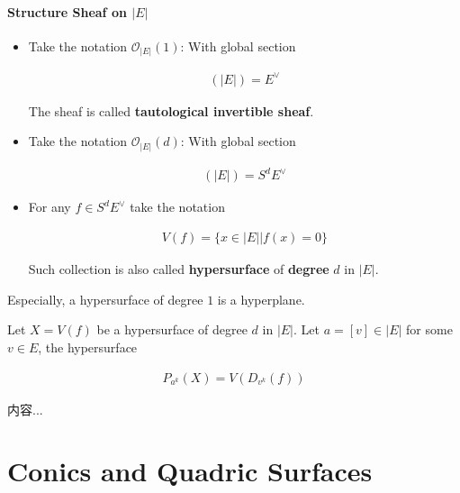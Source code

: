 \documentclass[Total.tex]{subfiles}
\begin{document}
		\subsubsection{Structure Sheaf on $|E|$}
		
		\begin{Def}
			\begin{itemize}
				\item Take the notation $\mathcal{O}_{|E|}(1)$: With global section
				
				\begin{gather*}
					[\mathcal{O}_{|E|}(1)](|E|)=E^\vee
				\end{gather*}
				
				The sheaf is called \textbf{tautological invertible sheaf}.
				
				\item Take the notation $\mathcal{O}_{|E|}(d)$: With global section
				
				\begin{gather*}
					[\mathcal{O}_{|E|}(d)](|E|)=S^dE^\vee
				\end{gather*}
				
				\item  For any $f\in S^d E^\vee$ take the notation 
				
				\begin{gather*}
					V(f)=\{x\in |E||f(x)=0\}
				\end{gather*}
				
				Such collection is also called \textbf{hypersurface} of \textbf{degree} $d$ in $|E|$. 
			\end{itemize}
		\end{Def}
		
		Especially, a hypersurface of degree $1$ is a hyperplane. 
		
		
		
		\begin{Def}
			Let $X=V(f)$ be a hypersurface of degree $d$ in $|E|$. Let $a=[v]\in |E|$ for some $v\in E$, the hypersurface
			
			\begin{gather*}
				P_{a^k}(X)=V(D_{v^k}(f))
			\end{gather*}
		\end{Def}
		
		\begin{example}
			内容...
		\end{example}
	
	\chapter{Conics and Quadric Surfaces}
		
	
\end{document}
